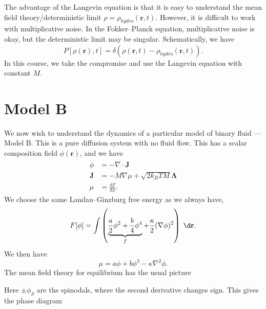 \documentclass[a4paper]{article}
\begin{document}
The advantage of the Langevin equation is that it is easy to understand the mean field theory/deterministic limit $\rho = \rho_{hydro}(\mathbf{r}, t)$. However, it is difficult to work with multiplicative noise. In the Fokker--Planck equation, multiplicative noise is okay, but the deterministic limit may be singular. Schematically, we have
\[
  P[\rho(\mathbf{r}), t] = \delta(\rho(\mathbf{r}, t) - \rho_{hydro}(\mathbf{r}, t)).
\]
In this course, we take the compromise and use the Langevin equation with constant $M$.

\section{Model B}
We now wish to understand the dynamics of a particular model of binary fluid --- Model B. This is a pure diffusion system with no fluid flow. This has a scalar composition field $\phi(\mathbf{r})$, and we have
\begin{align*}
  \dot{\phi} &= - \nabla \cdot \mathbf{J}\\
  \mathbf{J} &= - M \nabla \mu + \sqrt{2k_B TM} \boldsymbol \Lambda\\
  \mu &= \frac{\delta F}{\delta \phi}.
\end{align*}
We choose the same Landau--Ginzburg free energy as we always have,
\[
  F[\phi] = \int \left(\underbrace{\frac{a}{2} \phi^2 + \frac{b}{4}\phi^4}_f + \frac{\kappa}{2} (\nabla \phi)^2\right)\;\d \mathbf{r}.
\]
We then have
\[
  \mu = a \phi + b \phi^3 - \kappa \nabla^2 \phi.
\]
The mean field theory for equilibrium has the usual picture
\begin{center}
\end{center}
Here $\pm \phi_S$ are the spinodals, where the second derivative changes sign. This gives the phase diagram
\end{document}
